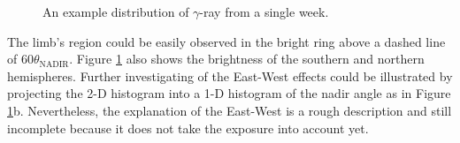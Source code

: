 \begin{figure}[h!]
    \centering
        \hfill
        \caption{An example distribution of $\gamma$-ray from a single week.}
       \label{fig:sample_photon_dist}
\end{figure}

The limb's region could be easily observed in the bright ring above 
a dashed line of 60\textdegree $\theta_\text{NADIR}$.
Figure \ref{fig:sample_photon_dist} also shows the brightness of 
the southern and northern hemispheres. Further investigating of the 
East-West effects could be illustrated by projecting the 2-D histogram 
into a 1-D histogram of the nadir angle as in Figure \ref{fig:sample_photon_dist}b.
Nevertheless, the explanation of the East-West is a rough description
and still incomplete because it does not take
the exposure into account yet.



